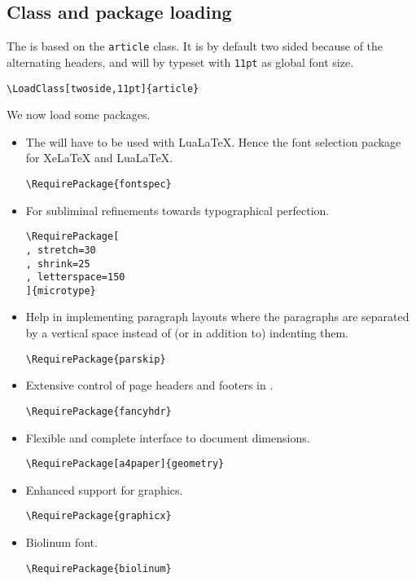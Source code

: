 \documentclass{letgut}
\begin{document}
\subsection{Class and package loading}
\label{ImplementationClassandpackageloading-aqfg55h0jlj0}
The  is based on the \lstinline+article+ class. It is by default two sided
because of the alternating headers, and will by typeset with \lstinline+11pt+ as global
font size.

\begin{lstlisting}
\LoadClass[twoside,11pt]{article}
\end{lstlisting}

We now load some packages.

\begin{itemize}
\item The  will have to be used with LuaLaTeX. Hence the font selection
package for XeLaTeX and LuaLaTeX.
\begin{lstlisting}
\RequirePackage{fontspec}
\end{lstlisting}
\item For subliminal refinements towards typographical perfection.
\begin{lstlisting}
\RequirePackage[
, stretch=30
, shrink=25
, letterspace=150
]{microtype}
\end{lstlisting}
\item Help in implementing paragraph layouts where the paragraphs are separated by
a vertical space instead of (or in addition to) indenting them.
\begin{lstlisting}
\RequirePackage{parskip}
\end{lstlisting}
\item Extensive control of page headers and footers in \LaTeXe.
\begin{lstlisting}
\RequirePackage{fancyhdr}
\end{lstlisting}
\item Flexible and complete interface to document dimensions.
\begin{lstlisting}
\RequirePackage[a4paper]{geometry}
\end{lstlisting}
\item Enhanced support for graphics.
\begin{lstlisting}
\RequirePackage{graphicx}
\end{lstlisting}
\item Biolinum font.
\begin{lstlisting}
\RequirePackage{biolinum}
\end{lstlisting}

\end{itemize}
\end{document}
